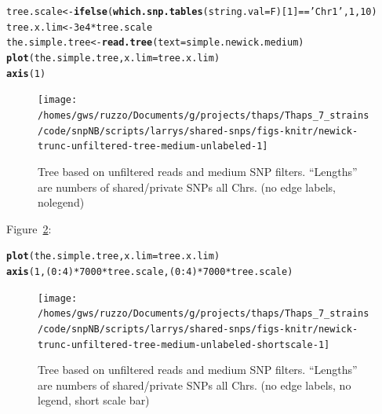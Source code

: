 \documentclass{article}\usepackage[]{graphicx}\usepackage[]{color}
\makeatletter
\newcommand{\hlnum}[1]{\textcolor[rgb]{0.686,0.059,0.569}{#1}}%
\newcommand{\hlstr}[1]{\textcolor[rgb]{0.192,0.494,0.8}{#1}}%
\newcommand{\hlopt}[1]{\textcolor[rgb]{0,0,0}{#1}}%
\newcommand{\hlstd}[1]{\textcolor[rgb]{0.345,0.345,0.345}{#1}}%
\newcommand{\hlkwb}[1]{\textcolor[rgb]{0.69,0.353,0.396}{#1}}%
\newcommand{\hlkwc}[1]{\textcolor[rgb]{0.333,0.667,0.333}{#1}}%
\newcommand{\hlkwd}[1]{\textcolor[rgb]{0.737,0.353,0.396}{\textbf{#1}}}%
\newenvironment{kframe}{%
 \def\at@end@of@kframe{}%
 \ifinner\ifhmode%
  \def\at@end@of@kframe{\end{minipage}}%
  \begin{minipage}{\columnwidth}%
 \fi\fi%
 \def\FrameCommand##1{\hskip\@totalleftmargin \hskip-\fboxsep
 \colorbox{shadecolor}{##1}\hskip-\fboxsep
     \hskip-\linewidth \hskip-\@totalleftmargin \hskip\columnwidth}%
 \MakeFramed {\advance\hsize-\width
   \@totalleftmargin\z@ \linewidth\hsize
   \@setminipage}}%
 {\par\unskip\endMakeFramed%
 \at@end@of@kframe}
\newenvironment{knitrout}{}{} %
\makeatother
\begin{document}
\begin{knitrout}\scriptsize
{}\color{fgcolor}\begin{kframe}
\begin{alltt}
\hlstd{tree.scale} \hlkwb{<-} \hlkwd{ifelse}\hlstd{(}\hlkwd{which.snp.tables}\hlstd{(}\hlkwc{string.val}\hlstd{=F)[}\hlnum{1}\hlstd{]}\hlopt{==}\hlstr{'Chr1'}\hlstd{,} \hlnum{1}\hlstd{,} \hlnum{10}\hlstd{)}
\hlstd{tree.x.lim} \hlkwb{<-} \hlnum{3e4} \hlopt{*} \hlstd{tree.scale}
\hlstd{the.simple.tree} \hlkwb{<-} \hlkwd{read.tree}\hlstd{(}\hlkwc{text}\hlstd{=simple.newick.medium)}
\hlkwd{plot}\hlstd{(the.simple.tree,} \hlkwc{x.lim} \hlstd{= tree.x.lim)}
\hlkwd{axis}\hlstd{(}\hlnum{1}\hlstd{)}
\end{alltt}
\end{kframe}\begin{figure}

{\centering \texttt{[image: /homes/gws/ruzzo/Documents/g/projects/thaps/Thaps\_7\_strains/code/snpNB/scripts/larrys/shared-snps/figs-knitr/newick-trunc-unfiltered-tree-medium-unlabeled-1]} 

}

\caption[Tree based on unfiltered reads and medium SNP filters]{Tree based on unfiltered reads and medium SNP filters.  ``Lengths'' are numbers of shared/private SNPs all Chrs. (no edge labels, nolegend)}\label{fig:tree-medium-unlabeled}
\end{figure}


\end{knitrout}

Figure~\ref{fig:tree-medium-unlabeled-shortscale}:

\begin{knitrout}\scriptsize
{}\color{fgcolor}\begin{kframe}
\begin{alltt}
\hlkwd{plot}\hlstd{(the.simple.tree,} \hlkwc{x.lim} \hlstd{= tree.x.lim)}
\hlkwd{axis}\hlstd{(}\hlnum{1}\hlstd{,(}\hlnum{0}\hlopt{:}\hlnum{4}\hlstd{)}\hlopt{*}\hlnum{7000}\hlopt{*}\hlstd{tree.scale,(}\hlnum{0}\hlopt{:}\hlnum{4}\hlstd{)}\hlopt{*}\hlnum{7000}\hlopt{*}\hlstd{tree.scale)}
\end{alltt}
\end{kframe}\begin{figure}

{\centering \texttt{[image: /homes/gws/ruzzo/Documents/g/projects/thaps/Thaps\_7\_strains/code/snpNB/scripts/larrys/shared-snps/figs-knitr/newick-trunc-unfiltered-tree-medium-unlabeled-shortscale-1]} 

}

\caption[Tree based on unfiltered reads and medium SNP filters]{Tree based on unfiltered reads and medium SNP filters.  ``Lengths'' are numbers of shared/private SNPs all Chrs. (no edge labels, no legend, short scale bar)}\label{fig:tree-medium-unlabeled-shortscale}
\end{figure}


\end{knitrout}
\end{document}
